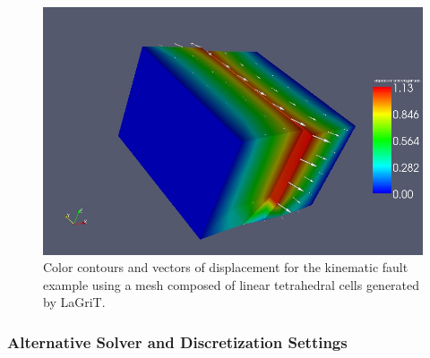 \noindent \begin{center}
\begin{figure}
\begin{centering}
\includegraphics[scale=0.45]{tutorials/3dtet4/figs/dislocation}
\par\end{centering}

\caption{Color contours and vectors of displacement for the kinematic fault
example using a mesh composed of linear tetrahedral cells generated
by LaGriT.\label{fig:3dtet-disloc}}
\end{figure}

\par\end{center}


\subsubsection{Alternative Solver and Discretization Settings}

